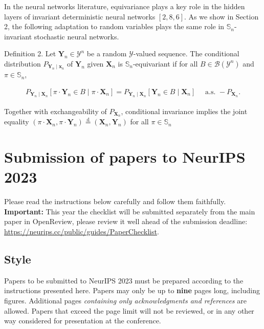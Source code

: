 \documentclass{article}
\begin{document}
In the neural networks literature, equivariance plays a key role in the hidden layers of invariant deterministic neural networks $[2,8,6]$. As we show in Section 2, the following adaptation to random variables plays the same role in $\mathbb{S}_n$-invariant stochastic neural networks.

Definition 2. Let $\mathbf{Y}_n \in \mathcal{Y}^n$ be a random $\mathcal{Y}$-valued sequence. The conditional distribution $P_{\mathbf{Y}_n \mid \mathbf{x}_n}$ of $\mathbf{Y}_n$ given $\mathbf{X}_n$ is $\mathbb{S}_n$-equivariant if for all $B \in \mathcal{B}\left(\mathcal{Y}^n\right)$ and $\pi \in \mathbb{S}_n$,

\begin{align}
  P_{\mathbf{Y}_n \mid \mathbf{X}_n}\left[\pi \cdot \mathbf{Y}_n \in B \mid \pi \cdot \mathbf{X}_n\right]=P_{\mathbf{Y}_n \mid \mathbf{X}_n}\left[\mathbf{Y}_n \in B \mid \mathbf{X}_n\right] \quad \text { a.s. }-P_{\mathbf{X}_n} .
\end{align}

Together with exchangeability of $P_{\mathbf{X}_n}$, conditional invariance implies the joint equality $\left(\pi \cdot \mathbf{X}_n, \pi \cdot \mathbf{Y}_n\right) \stackrel{\mathrm{d}}{=}\left(\mathbf{X}_n, \mathbf{Y}_n\right)$ for all $\pi \in \mathbb{S}_n$


\section{Submission of papers to NeurIPS 2023}


Please \cite{vaswani2017attention} read the instructions below carefully and follow them faithfully. \textbf{Important:} This year the checklist will be submitted separately from the main paper in OpenReview, please review it well ahead of the submission deadline: \url{https://neurips.cc/public/guides/PaperChecklist}.


\subsection{Style}


Papers to be submitted to NeurIPS 2023 must be prepared according to the
instructions presented here. Papers may only be up to {\bf nine} pages long,
including figures. Additional pages \emph{containing only acknowledgments and
  references} are allowed. Papers that exceed the page limit will not be
reviewed, or in any other way considered for presentation at the conference.
\end{document}
